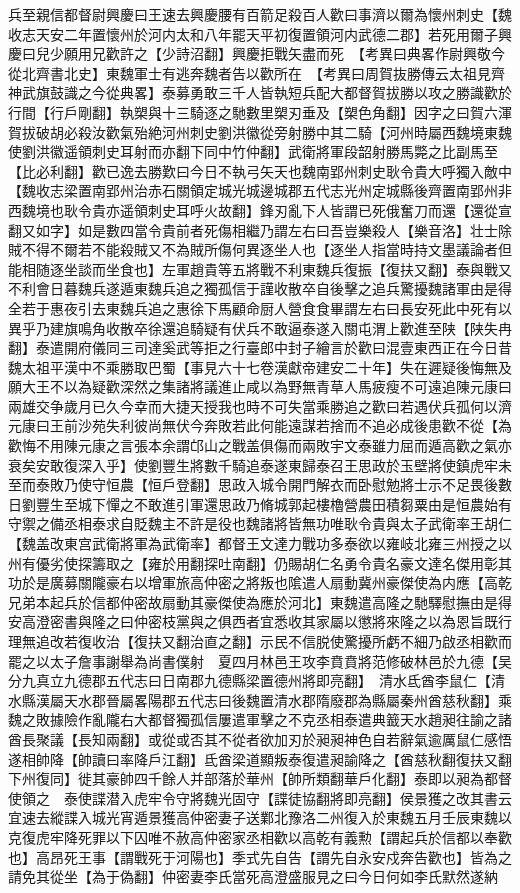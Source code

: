 兵至親信都督尉興慶曰王速去興慶腰有百箭足殺百人歡曰事濟以爾為懷州刺史【魏收志天安二年置懷州於河内太和八年罷天平初復置領河内武德二郡】若死用爾子興慶曰兒少願用兄歡許之【少詩沼翻】興慶拒戰矢盡而死　【考異曰典畧作尉興敬今從北齊書北史】東魏軍士有逃奔魏者告以歡所在　【考異曰周賀抜勝傳云太祖見齊神武旗鼓識之今從典畧】泰募勇敢三千人皆執短兵配大都督賀拔勝以攻之勝識歡於行間【行戶剛翻】執槊與十三騎逐之馳數里槊刃垂及【槊色角翻】因字之曰賀六渾賀拔破胡必殺汝歡氣殆絶河州刺史劉洪徽從旁射勝中其二騎【河州時屬西魏境東魏使劉洪徽遥領刺史耳射而亦翻下同中竹仲翻】武衛將軍段韶射勝馬斃之比副馬至【比必利翻】歡已逸去勝歎曰今日不執弓矢天也魏南郢州刺史耿令貴大呼獨入敵中【魏收志梁置南郢州治赤石關領定城光城邊城郡五代志光州定城縣後齊置南郢州非西魏境也耿令貴亦遥領刺史耳呼火故翻】鋒刃亂下人皆謂已死俄奮刀而還【還從宣翻又如字】如是數四當令貴前者死傷相繼乃謂左右曰吾豈樂殺人【樂音洛】壮士除賊不得不爾若不能殺賊又不為賊所傷何異逐坐人也【逐坐人指當時持文墨議論者但能相随逐坐談而坐食也】左軍趙貴等五將戰不利東魏兵復振【復扶又翻】泰與戰又不利會日暮魏兵遂遁東魏兵追之獨孤信于謹收散卒自後擊之追兵驚擾魏諸軍由是得全若于惠夜引去東魏兵追之惠徐下馬顧命厨人營食食畢謂左右曰長安死此中死有以異乎乃建旗鳴角收散卒徐還追騎疑有伏兵不敢逼泰遂入關屯渭上歡進至陕【陕失冉翻】泰遣開府儀同三司達奚武等拒之行臺郎中封子繪言於歡曰混壹東西正在今日昔魏太祖平漢中不乘勝取巴蜀【事見六十七卷漢獻帝建安二十年】失在遲疑後悔無及願大王不以為疑歡深然之集諸將議進止咸以為野無青草人馬疲瘦不可遠追陳元康曰兩雄交争歲月已久今幸而大捷天授我也時不可失當乘勝追之歡曰若遇伏兵孤何以濟元康曰王前沙苑失利彼尚無伏今奔敗若此何能遠謀若捨而不追必成後患歡不從【為歡悔不用陳元康之言張本余謂邙山之戰盖俱傷而兩敗宇文泰雖力屈而遁高歡之氣亦衰矣安敢復深入乎】使劉豐生將數千騎追泰遂東歸泰召王思政於玉壁將使鎮虎牢未至而泰敗乃使守恒農【恒戶登翻】思政入城令開門解衣而卧慰勉將士示不足畏後數日劉豐生至城下憚之不敢進引軍還思政乃脩城郭起樓櫓營農田積芻粟由是恒農始有守禦之備丞相泰求自貶魏主不許是役也魏諸將皆無功唯耿令貴與太子武衛率王胡仁【魏盖改東宫武衛將軍為武衛率】都督王文達力戰功多泰欲以雍岐北雍三州授之以州有優劣使探籌取之【雍於用翻探吐南翻】仍賜胡仁名勇令貴名豪文達名傑用彰其功於是廣募關隴豪右以增軍旅高仲密之將叛也隂遣人扇動冀州豪傑使為内應【高乾兄弟本起兵於信都仲密故扇動其豪傑使為應於河北】東魏遣高隆之馳驛慰撫由是得安高澄密書與隆之曰仲密枝黨與之俱西者宜悉收其家屬以懲將來隆之以為恩旨既行理無追改若復收治【復扶又翻治直之翻】示民不信脱使驚擾所虧不細乃啟丞相歡而罷之以太子詹事謝舉為尚書僕射　夏四月林邑王攻李賁賁將范修破林邑於九德【吴分九真立九德郡五代志曰日南郡九德縣梁置德州將即亮翻】　清水氐酋李鼠仁【清水縣漢屬天水郡晉屬畧陽郡五代志曰後魏置清水郡隋廢郡為縣屬秦州酋慈秋翻】乘魏之敗據險作亂隴右大都督獨孤信屢遣軍擊之不克丞相泰遣典籖天水趙昶往諭之諸酋長聚議【長知兩翻】或從或否其不從者欲加刃於昶昶神色自若辭氣逾厲鼠仁感悟遂相帥降【帥讀曰率降戶江翻】氐酋梁道顯叛泰復遣昶諭降之【酋慈秋翻復扶又翻下州復同】徙其豪帥四千餘人并部落於華州【帥所類翻華戶化翻】泰即以昶為都督使領之　泰使諜潜入虎牢令守將魏光固守【諜徒協翻將即亮翻】侯景獲之改其書云宜速去縱諜入城光宵遁景獲高仲密妻子送鄴北豫洛二州復入於東魏五月壬辰東魏以克復虎牢降死罪以下囚唯不赦高仲密家丞相歡以高乾有義勲【謂起兵於信都以奉歡也】高昂死王事【謂戰死于河陽也】季式先自告【謂先自永安戍奔告歡也】皆為之請免其從坐【為于偽翻】仲密妻李氏當死高澄盛服見之曰今日何如李氏默然遂納